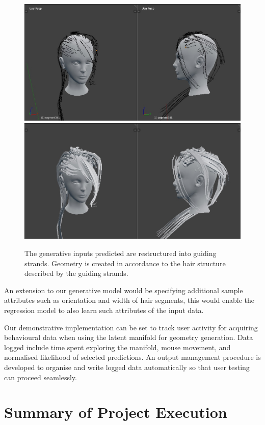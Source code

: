 \documentclass[ %
author={Dillon Keith Diep},
supervisor={Dr. Carl Henrik Ek},
degree={MEng},
title={ART-CG Hair:},
subtitle={Assisted Real-time Content Generation of Stylised Virtual Hair},
type={Research},
year={2017} ]{dissertation}
\begin{document}
\begin{figure}[!h]
	\centering
	\caption{The generative inputs predicted are restructured into guiding strands. Geometry is created in accordance to the hair structure described by the guiding strands.}
	\includegraphics[scale=0.3]{images/guidingStrands}
	\includegraphics[scale=0.3]{images/guidingExtrusion}
\end{figure}

An extension to our generative model would be specifying additional sample attributes such as orientation and width of hair segments, this would enable the regression model to also learn such attributes of the input data.

Our demonstrative implementation can be set to track user activity for acquiring behavioural data when using the latent manifold for geometry generation. Data logged include time spent exploring the manifold, mouse movement, and normalised likelihood of selected predictions. An output management procedure is developed to organise and write logged data automatically so that user testing can proceed seamlessly.

\section{Summary of Project Execution}
\end{document}
